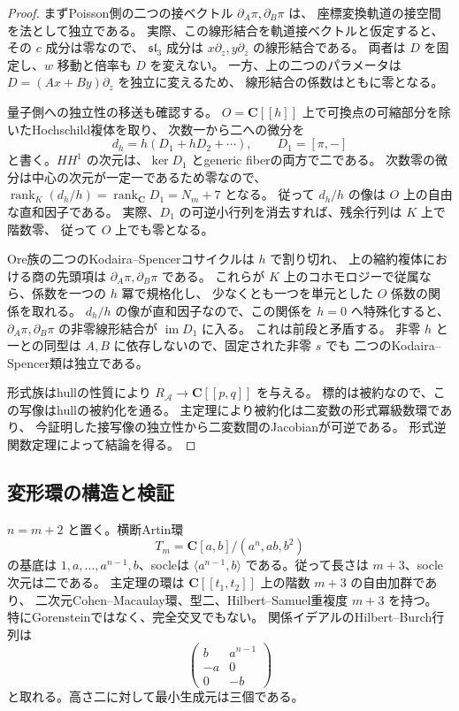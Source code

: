 \begin{proof}
まずPoisson側の二つの接ベクトル $\partial_A\pi,\partial_B\pi$ は、
座標変換軌道の接空間を法として独立である。
実際、この線形結合を軌道接ベクトルと仮定すると、その $c$ 成分は零なので、
$\mathfrak{sl}_3$ 成分は $x\partial_z,y\partial_z$ の線形結合である。
両者は $D$ を固定し、$w$ 移動と倍率も $D$ を変えない。
一方、上の二つのパラメータは $D=(Ax+By)\partial_z$ を独立に変えるため、
線形結合の係数はともに零となる。

量子側への独立性の移送も確認する。
$O=\mathbf C[[h]]$ 上で可換点の可縮部分を除いたHochschild複体を取り、
次数一から二への微分を
\[
 d_h=h(D_1+hD_2+\cdots),\qquad D_1=[\pi,-]
\]
と書く。$HH^1$ の次元は、$\ker D_1$ とgeneric fiberの両方で二である。
次数零の微分は中心の次元が一定一であるため零なので、
$\operatorname{rank}_K(d_h/h)=\operatorname{rank}_{\mathbf C}D_1=N_m+7$ となる。
従って $d_h/h$ の像は $O$ 上の自由な直和因子である。
実際、$D_1$ の可逆小行列を消去すれば、残余行列は $K$ 上で階数零、
従って $O$ 上でも零となる。

Ore族の二つのKodaira--Spencerコサイクルは $h$ で割り切れ、
上の縮約複体における商の先頭項は $\partial_A\pi,\partial_B\pi$ である。
これらが $K$ 上のコホモロジーで従属なら、係数を一つの $h$ 冪で規格化し、
少なくとも一つを単元とした $O$ 係数の関係を取れる。
$d_h/h$ の像が直和因子なので、この関係を $h=0$ へ特殊化すると、
$\partial_A\pi,\partial_B\pi$ の非零線形結合が $\operatorname{im}D_1$ に入る。
これは前段と矛盾する。
非零 $h$ と一との同型は $A,B$ に依存しないので、固定された非零 $s$ でも
二つのKodaira--Spencer類は独立である。

形式族はhullの性質により $R_{\mathcal A}\to\mathbf C[[p,q]]$ を与える。
標的は被約なので、この写像はhullの被約化を通る。
主定理により被約化は二変数の形式冪級数環であり、
今証明した接写像の独立性から二変数間のJacobianが可逆である。
形式逆関数定理によって結論を得る。
\end{proof}

\subsection{変形環の構造と検証}

$n=m+2$ と置く。横断Artin環
\[
 T_m=\mathbf C[a,b]/(a^n,ab,b^2)
\]
の基底は $1,a,\ldots,a^{n-1},b$、socleは
$\langle a^{n-1},b\rangle$ である。従って長さは $m+3$、socle次元は二である。
主定理の環は $\mathbf C[[t_1,t_2]]$ 上の階数 $m+3$ の自由加群であり、
二次元Cohen--Macaulay環、型二、Hilbert--Samuel重複度 $m+3$ を持つ。
特にGorensteinではなく、完全交叉でもない。
関係イデアルのHilbert--Burch行列は
\[
 \begin{pmatrix}
 b&a^{n-1}\\
 -a&0\\
 0&-b
 \end{pmatrix}
\]
と取れる。高さ二に対して最小生成元は三個である。

